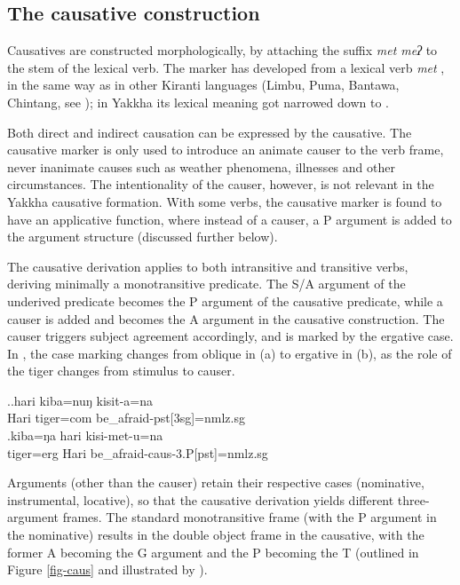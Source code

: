 \subsection{The causative construction}\label{caus}

Causatives are constructed morphologically, by attaching the suffix \emph{met \ti meʔ} to the stem of the lexical verb. The marker has developed from a lexical verb \emph{met} , in the same way as in other Kiranti languages (Limbu, Puma, Bantawa, Chintang, see \citet{Driem1987A-grammar, Bickeletal2006The-Chintang, Doornenbal2009A-grammar}); in Yakkha its lexical meaning got narrowed down to . 

Both direct and indirect causation can be expressed by the causa\-tive. The causative marker is only used to introduce an animate causer to the verb frame, never inanimate causes such as weather phenomena, illnesses and other circumstances. The intentionality of the causer, however, is not relevant in the Yakkha causative formation. With some verbs, the causative marker is found to have an applicative function,  where instead of a causer, a P argument is added to the argument structure (discussed further below).


The causative derivation applies to both intransitive and transitive verbs, deriving minimally a monotransitive predicate. The S/A argument of the underived predicate becomes the P argument of the causative predicate, while a causer is added and becomes the A argument in the causative construction. The causer triggers  subject agreement accordingly, and is marked by the ergative case. In \Next, the case marking changes from oblique in (a) to ergative in (b), as the role of the tiger changes from stimulus to causer.

\ex.\ag.hari kiba=nuŋ kisit-a=na\\
Hari tiger{\sc =com} be\_afraid{\sc -pst[3sg]=nmlz.sg}\\
\bg.kiba=ŋa hari kisi-met-u=na\\
tiger{\sc =erg} Hari be\_afraid{\sc -caus-3.P[pst]=nmlz.sg}\\


Arguments (other than the causer) retain their respective cases (nominative, instrumental, locative), so that the causative derivation yields different three-argument frames. The standard monotransitive frame (with the P argument in the nominative) results in the double object frame in the causative, with the former A becoming the G argument and the P becoming the T (outlined in Figure \ref{fig-caus} and illustrated by \Next). 

